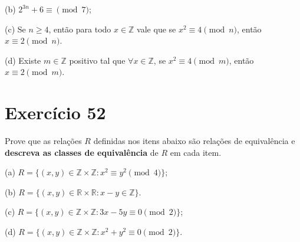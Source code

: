 \documentclass{article}
\begin{document}
(b) $2^{3n}+6\equiv\pmod 7$;

(c) Se $n\geq 4$, então para todo $x\in\mathbb{Z}$ vale que se $x^2\equiv 4\pmod n$, então $x\equiv 2\pmod n$.

(d) Existe $m\in\mathbb{Z}$ positivo tal que  $\forall x\in\mathbb{Z}$, se $x^2\equiv 4\pmod m$, então $x\equiv 2\pmod m$.

\section*{Exercício 52}

Prove que as relações $R$ definidas nos itens abaixo são relações de equivalência e \textbf{descreva as classes de equivalência} de $R$ em cada item.

(a) $R=\{(x,y)\in \mathbb{Z}\times \mathbb{Z}\colon x^2\equiv y^2\pmod 4\}$;

(b) $R=\{(x,y)\in \mathbb{R}\times\mathbb{R}\colon x-y\in\mathbb{Z}\}$.

(c) $R=\{(x,y)\in \mathbb{Z}\times \mathbb{Z}\colon 3x-5y \equiv 0\pmod 2\}$;

(d) $R=\{(x,y)\in \mathbb{Z}\times \mathbb{Z}\colon x^2+y^2\equiv 0\pmod 2\}$.
\end{document}
